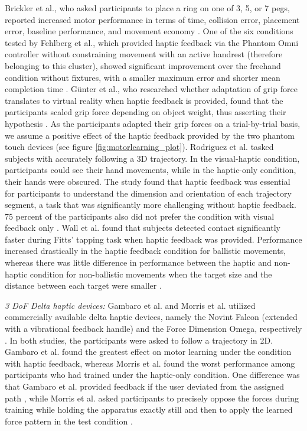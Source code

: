 Brickler et al., who asked participants to place a ring on one of 3, 5, or 7 pegs, reported increased motor performance in terms of time, collision error, placement error, baseline performance, and movement economy \cite{Brickler2019}. One of the six conditions tested by Fehlberg et al., which provided haptic feedback via the Phantom Omni controller without constraining movement with an active handrest (therefore belonging to this cluster), showed significant improvement over the freehand condition without fixtures, with a smaller maximum error and shorter mean completion time \cite{Fehlberg2012}. Günter et al., who researched whether adaptation of grip force translates to virtual reality when haptic feedback is provided, found that the participants scaled grip force depending on object weight, thus asserting their hypothesis \cite{Gunter2022}. As the participants adapted their grip forces on a trial-by-trial basis, we assume a positive effect of the haptic feedback provided by the two phantom touch devices (see figure \ref{fig:motorlearning_plot}). 
Rodriguez et al. tasked subjects with accurately following a 3D trajectory. In the visual-haptic condition, participants could see their hand movements, while in the haptic-only condition, their hands were obscured. The study found that haptic feedback was essential for participants to understand the dimension and orientation of each trajectory segment, a task that was significantly more challenging without haptic feedback. 75 percent of the participants also did not prefer the condition with visual feedback only \cite{Rodriguez2010}. Wall et al. found that subjects detected contact significantly faster during Fitts' tapping task when haptic feedback was provided. Performance increased drastically in the haptic feedback condition for ballistic movements, whereas there was little difference in performance between the haptic and non-haptic condition for non-ballistic movements when the target size and the distance between each target were smaller \cite{Wall2000}.

\textit{3 DoF Delta haptic devices:} Gambaro et al. and Morris et al. utilized commercially available delta haptic devices, namely the Novint Falcon (extended with a vibrational feedback handle) and the Force Dimension Omega, respectively \cite{Gambaro2014, Morris2007}. In both studies, the participants were asked to follow a trajectory in 2D. Gambaro et al. found the greatest effect on motor learning under the condition with haptic feedback, whereas Morris et al. found the worst performance among participants who had trained under the haptic-only condition. One difference was that Gambaro et al. provided feedback if the user deviated from the assigned path \cite{Gambaro2014}, while Morris et al. asked participants to precisely oppose the forces during training while holding the apparatus exactly still and then to apply the learned force pattern in the test condition \cite{Morris2007}. 

